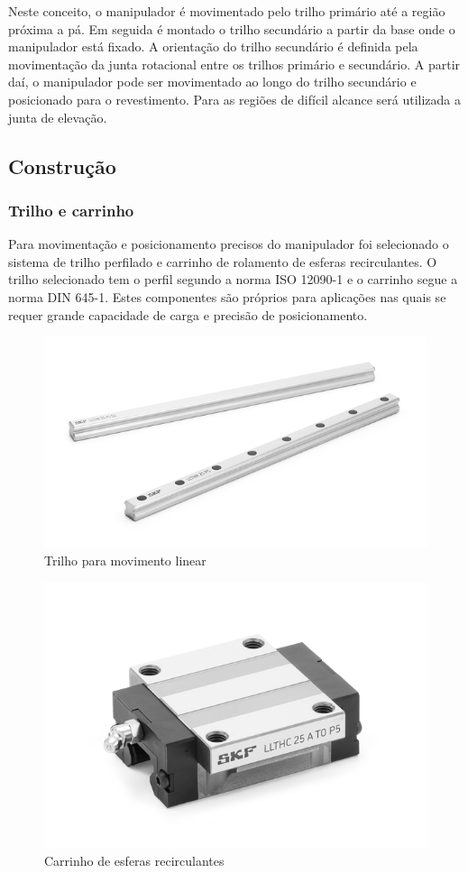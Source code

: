 Neste conceito, o manipulador é movimentado pelo trilho primário até a região
próxima a pá. Em seguida é montado o trilho secundário a partir da base onde o
manipulador está fixado. A orientação do trilho secundário é definida pela
movimentação da junta rotacional entre os trilhos primário e secundário. A
partir daí, o manipulador pode ser movimentado ao longo do trilho secundário e
posicionado para o revestimento. Para as regiões de difícil alcance será
utilizada a junta de elevação.

\subsection{Construção}

\subsubsection{Trilho e carrinho}

Para movimentação e posicionamento precisos do manipulador foi selecionado o
sistema de trilho perfilado e carrinho de rolamento de esferas recirculantes. 
O trilho selecionado tem o perfil segundo a norma ISO 12090-1 e o carrinho segue
a norma DIN 645-1. 
Estes componentes são próprios para aplicações nas quais se requer grande
capacidade de carga e precisão de posicionamento.

\begin{figure}[h!]
	\centering
	\includegraphics[width=0.7\columnwidth]{method/figs/construcao/trilho_LLT}
	\caption{Trilho para movimento linear}
    \label{fig::trilho}
\end{figure}

\begin{figure}[h!]
	\centering
	\includegraphics[width=0.7\columnwidth]{method/figs/construcao/carrinho}
	\caption{Carrinho de esferas recirculantes}
    \label{fig::carrinho}
\end{figure}

